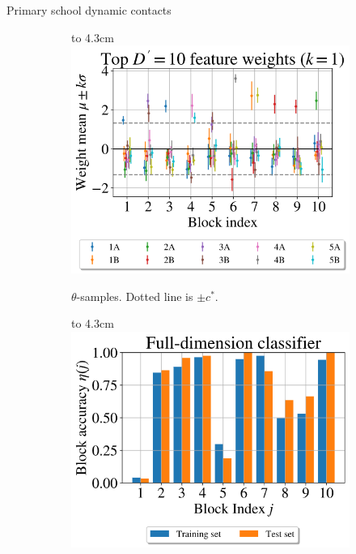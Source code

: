 \documentclass{beamer}
\def\imagebox#1#2{\vtop to #1{\null\hbox{#2}\vfill}}
\begin{document}
	\begin{frame}{Primary school dynamic contacts \cite{schools}}
		\begin{figure}[!h]
			\centering
			\begin{subfigure}[t]{0.45\linewidth}
				\centering
				\imagebox{4.3cm}{\includegraphics[width=\linewidth]{school-null-1}}
				\caption{$\theta$-samples. Dotted line is $\pm c^*$.}
			\end{subfigure}
			\begin{subfigure}[t]{0.45\linewidth}
				\centering
				\imagebox{4.3cm}{\includegraphics[width=\linewidth]{school-accuracy-1}}
			\end{subfigure}
		\end{figure}
		

\end{frame}
\end{document}

